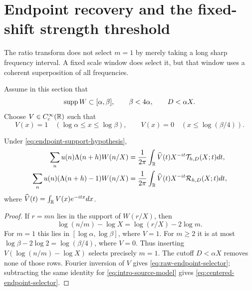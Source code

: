 \section{Endpoint recovery and the fixed-shift strength threshold}
\label{sec:endpoint-strength}

The ratio transform does not select $m=1$ by merely taking a long sharp
frequency interval.  A fixed scale window does select it, but that window
uses a coherent superposition of all frequencies.

Assume in this section that
\begin{equation}
 \operatorname{supp} W\subset[\alpha,\beta],
 \qquad \beta<4\alpha,
 \qquad D<\alpha X.
 \label{eq:endpoint-support-hypothesis}
\end{equation}
Choose $V\in C_c^\infty(\mathbb R)$ such that
\begin{equation}
 V(x)=1\quad(\log\alpha\leq x\leq\log\beta),
 \qquad
 V(x)=0\quad(x\leq\log(\beta/4)).
 \label{eq:endpoint-window}
\end{equation}

\begin{proposition}
\label{prop:one-Mellin-endpoint-selector}
Under \eqref{eq:endpoint-support-hypothesis},
\begin{align}
 \sum_n u(n)\Lambda(n+h)W(n/X)
 &=\frac1{2\pi}\int_\mathbb R
 \widehat V(t)X^{-it}\mathcal T_{h,D}(X;t)dt,
 \label{eq:raw-endpoint-selector}\\
 \sum_n u(n)(\Lambda(n+h)-1)W(n/X)
 &=\frac1{2\pi}\int_\mathbb R
 \widehat V(t)X^{-it}\mathcal R_{h,D}(X;t)dt,
 \label{eq:centered-endpoint-selector}
\end{align}
where $\widehat V(t)=\int_\mathbb R V(x)e^{-itx}dx$.
\end{proposition}

\begin{proof}
If $r=mn$ lies in the support of $W(r/X)$, then
\begin{equation}
 \log(n/m)-\log X=\log(r/X)-2\log m.
 \label{eq:endpoint-coordinate}
\end{equation}
For $m=1$ this lies in $[\log\alpha,\log\beta]$, where $V=1$.  For
$m\geq2$ it is at most $\log\beta-2\log2=\log(\beta/4)$, where $V=0$.
Thus inserting $V(\log(n/m)-\log X)$ selects precisely $m=1$.
The cutoff $D<\alpha X$ removes none of those rows.  Fourier inversion of
$V$ gives \eqref{eq:raw-endpoint-selector}; subtracting the same identity
for \eqref{eq:intro-source-model} gives
\eqref{eq:centered-endpoint-selector}.
\end{proof}

